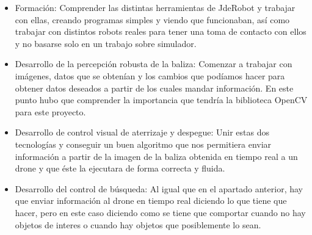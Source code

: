 \begin{itemize}
\item{Formaci\'on:} Comprender las distintas herramientas de JdeRobot y trabajar con ellas, creando programas simples y viendo que funcionaban, as\'i como trabajar con distintos robots reales para tener una toma de contacto con ellos y no basarse solo en un trabajo sobre simulador. 

\item{Desarrollo de la percepci\'on robusta de la baliza:} Comenzar a trabajar con im\'agenes, datos que se obten\'ian y los cambios que pod\'iamos hacer para obtener datos deseados a partir de los cuales mandar informaci\'on. En este punto hubo que comprender la importancia que tendr\'ia la biblioteca OpenCV para este proyecto.

\item{Desarrollo de control visual de aterrizaje y despegue:} Unir estas dos tecnolog\'ias y conseguir un buen algoritmo que nos permitiera enviar informaci\'on a partir de la imagen de la baliza obtenida en tiempo real a un drone y que \'este la ejecutara de forma correcta y fluida.  

\item{Desarrollo del control de b\'usqueda:} Al igual que en el apartado anterior, hay que enviar informaci\'on al drone en tiempo real diciendo lo que tiene que hacer, pero en este caso diciendo como se tiene que comportar cuando no hay objetos de interes o cuando hay objetos que posiblemente lo sean. 


\end{itemize}






























